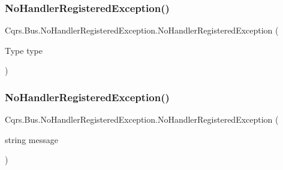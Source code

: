 \subsubsection{\texorpdfstring{No\+Handler\+Registered\+Exception()}{NoHandlerRegisteredException()}\hspace{0.1cm}{\footnotesize\ttfamily [1/2]}}
{\footnotesize\ttfamily Cqrs.\+Bus.\+No\+Handler\+Registered\+Exception.\+No\+Handler\+Registered\+Exception (\begin{DoxyParamCaption}\item[{Type}]{type }\end{DoxyParamCaption})}

\mbox{\label{classCqrs_1_1Bus_1_1NoHandlerRegisteredException_a6f163c9b3fe405f817f97ac8187bf691}} 
\subsubsection{\texorpdfstring{No\+Handler\+Registered\+Exception()}{NoHandlerRegisteredException()}\hspace{0.1cm}{\footnotesize\ttfamily [2/2]}}
{\footnotesize\ttfamily Cqrs.\+Bus.\+No\+Handler\+Registered\+Exception.\+No\+Handler\+Registered\+Exception (\begin{DoxyParamCaption}\item[{string}]{message }\end{DoxyParamCaption})}

